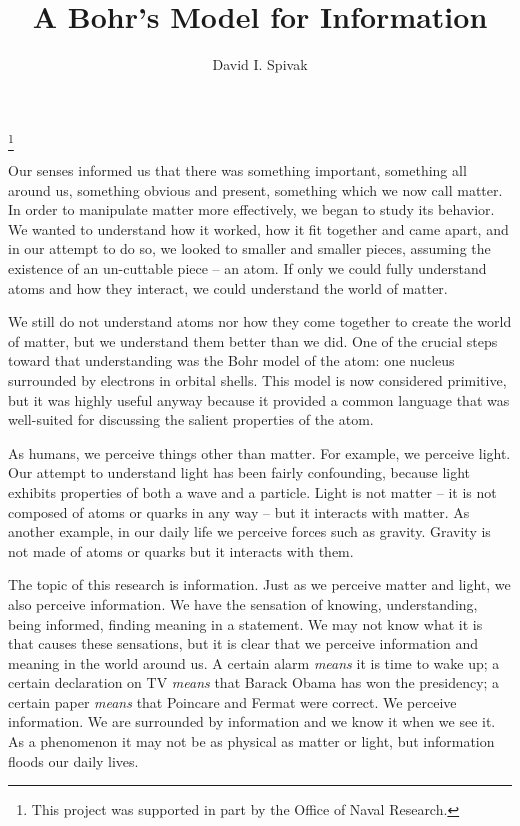 \documentclass{amsart}
\begin{document}
\author{David I. Spivak}

\title{A Bohr's Model for Information}

\thanks{This project was supported in part by the Office of Naval Research.}

\maketitle

Our senses informed us that there was something important, something all around us, something obvious and present, something which we now call matter.  In order to manipulate matter more effectively, we began to study its behavior.  We wanted to understand how it worked, how it fit together and came apart, and in our attempt to do so, we looked to smaller and smaller pieces, assuming the existence of an un-cuttable piece -- an atom.  If only we could fully understand atoms and how they interact, we could understand the world of matter.

We still do not understand atoms nor how they come together to create the world of matter, but we understand them better than we did.  One of the crucial steps toward that understanding was the Bohr model of the atom: one nucleus surrounded by electrons in orbital shells.  This model is now considered primitive, but it was highly useful anyway because it provided a common language that was well-suited for discussing the salient properties of the atom.

As humans, we perceive things other than matter.  For example, we perceive light.  Our attempt to understand light has been fairly confounding, because light exhibits properties of both a wave and a particle.  Light is not matter -- it is not composed of atoms or quarks in any way -- but it interacts with matter.  As another example, in our daily life we perceive forces such as gravity.  Gravity is not made of atoms or quarks but it interacts with them.  

The topic of this research is information.  Just as we perceive matter and light, we also perceive information.  We have the sensation of knowing, understanding, being informed, finding meaning in a statement.  We may not know what it is that causes these sensations, but it is clear that we perceive information and meaning in the world around us.  A certain alarm {\em means} it is time to wake up; a certain declaration on TV {\em means} that Barack Obama has won the presidency; a certain paper {\em means} that Poincare and Fermat were correct.  We perceive information.  We are surrounded by information and we know it when we see it.  As a phenomenon it may not be as physical as matter or light, but information floods our daily lives.  
\end{document}
